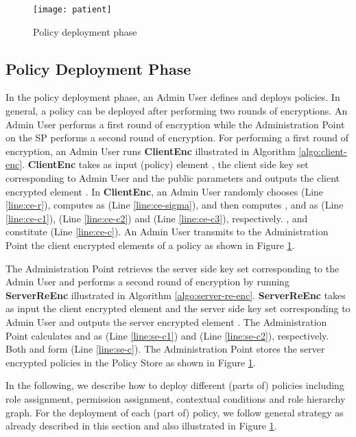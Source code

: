 \documentclass[final,5p,times,twocolumn]{elsarticle}
\begin{document}
\begin{figure}
\centering
\texttt{[image: patient]} \caption{Policy deployment phase}
\label{fig:patient}
\end{figure}

\subsection{Policy Deployment Phase}
In the policy deployment phase, an Admin User defines and deploys policies. In general, a policy can be deployed after performing two rounds of encryptions. An Admin User performs a first round of encryption while the Administration Point on the SP performs a second round of encryption. For performing a first round of encryption, an Admin User runs \textbf{ClientEnc} illustrated in Algorithm \ref{algo:client-enc}. \textbf{ClientEnc} takes as input (policy) element , the client side key set  corresponding to Admin User  and the public parameters  and outputs the client encrypted element . In \textbf{ClientEnc}, an Admin User randomly chooses  (Line \ref{line:ce-r}), computes  as  (Line \ref{line:ce-sigma}), and then computes ,  and  as  (Line \ref{line:ce-c1}),  (Line \ref{line:ce-c2}) and  (Line \ref{line:ce-c3}), respectively. ,  and  constitute  (Line \ref{line:ce-c}). An Admin User transmits to the Administration Point the client encrypted elements of a policy as shown in Figure \ref{fig:patient}.

The Administration Point retrieves the server side key set corresponding to the Admin User and performs a second round of encryption by running \textbf{ServerReEnc} illustrated in Algorithm \ref{algo:server-re-enc}. \textbf{ServerReEnc} takes as input the client encrypted element  and the server side key set  corresponding to Admin User  and outputs the server encrypted element . The Administration Point calculates  and  as  (Line \ref{line:se-c1}) and  (Line \ref{line:se-c2}), respectively. Both  and  form  (Line \ref{line:se-c}). The Administration Point stores the server encrypted policies in the Policy Store as shown in Figure \ref{fig:patient}.

In the following, we describe how to deploy different (parts of) policies including role assignment, permission assignment, contextual conditions and role hierarchy graph. For the deployment of each (part of) policy, we follow general strategy as already described in this section and also illustrated in Figure \ref{fig:patient}.
\end{document}
